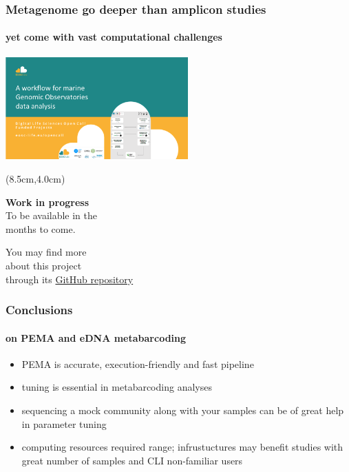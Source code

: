 \documentclass{beamer}
\begin{document}
   \begin{frame}
      \frametitle{Metagenome go deeper than amplicon studies}
      \framesubtitle{yet come with vast computational challenges}
      \includegraphics[width=70mm]{resources/marine-genomic-observatories.png}

      \begin{textblock*}{5cm}(8.5cm,4.0cm) %
            
         \textbf{Work in progress} \\
         To be available in the \\ months to come.

         \bigskip
         
         \footnotesize
         You may find more \\ 
         \footnotesize
         about this project  \\
         \footnotesize
         through its \href{https://github.com/emo-bon/pipeline-v5}{GitHub repository}

      \end{textblock*}
   \end{frame}
   \fi

   \begin{frame}
      \frametitle{Conclusions}
      \framesubtitle{on PEMA and eDNA metabarcoding}

      \begin{itemize}
         \item PEMA is accurate, execution-friendly and fast pipeline 
         \item tuning is essential in metabarcoding analyses
         \item sequencing a mock community along with your samples can be of great help in parameter tuning 
         \item computing resources required range; infrustuctures may benefit studies with great number of samples and CLI non-familiar users
      \end{itemize}


   \end{frame}
\end{document}
